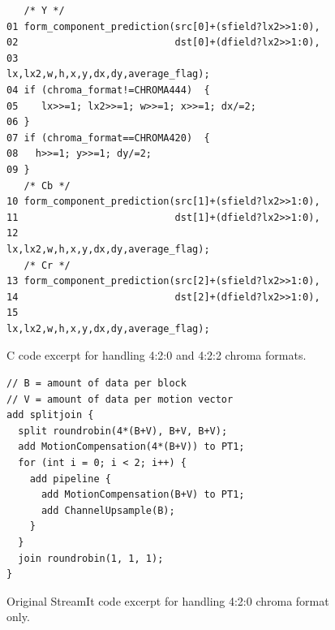 \begin{figure}
\begin{center}
  \begin{minipage}[t]{4.8in}
    \begin{small}
      \begin{verbatim}
   /* Y */
01 form_component_prediction(src[0]+(sfield?lx2>>1:0),
02                           dst[0]+(dfield?lx2>>1:0),
03                           lx,lx2,w,h,x,y,dx,dy,average_flag);
04 if (chroma_format!=CHROMA444)  {
05    lx>>=1; lx2>>=1; w>>=1; x>>=1; dx/=2;
06 }
07 if (chroma_format==CHROMA420)  {
08   h>>=1; y>>=1; dy/=2;
09 }
   /* Cb */
10 form_component_prediction(src[1]+(sfield?lx2>>1:0),
11                           dst[1]+(dfield?lx2>>1:0),
12                           lx,lx2,w,h,x,y,dx,dy,average_flag);
   /* Cr */
13 form_component_prediction(src[2]+(sfield?lx2>>1:0),
14                           dst[2]+(dfield?lx2>>1:0),
15                           lx,lx2,w,h,x,y,dx,dy,average_flag);    
      \end{verbatim}
    \end{small}
  \end{minipage}
  \caption{C code excerpt for handling
           4:2:0 and 4:2:2 chroma formats.}
  \label{fig:chroma-format-code-C}
\end{center}
\end{figure}

\begin{figure}
\begin{center}
  \begin{minipage}[t]{3.5in}
    \begin{small}
      \begin{verbatim}
// B = amount of data per block
// V = amount of data per motion vector
add splitjoin {
  split roundrobin(4*(B+V), B+V, B+V);
  add MotionCompensation(4*(B+V)) to PT1;
  for (int i = 0; i < 2; i++) {
    add pipeline {
      add MotionCompensation(B+V) to PT1;
      add ChannelUpsample(B);
    }
  }
  join roundrobin(1, 1, 1);
}
      \end{verbatim}
    \end{small}
  \end{minipage}
  \caption{Original StreamIt code excerpt for handling
           4:2:0 chroma format only.}
  \label{fig:chroma-format-code-streamit-previous}
\end{center}
\end{figure}

